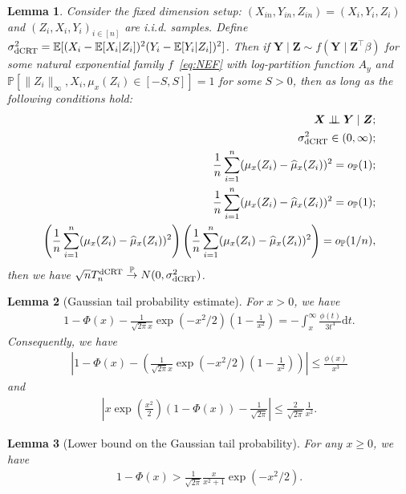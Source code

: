 \documentclass[12pt]{article}
\newtheorem{lemma}{Lemma}
\theoremstyle{definition}
\newcommand{\indep}{\perp \!\!\! \perp}
\def\P{\mathbb{P}}
\def\P{\mathbb{P}}
\newcommand{\E}{\mathbb E}								%
\renewcommand{\P}{\mathbb{P}}							%
\newcommand{\convp}{\overset{\mathbb{P}}{\rightarrow}}             %
\newcommand{\prx}{\bm X}								%
\newcommand{\srx}{X}									%
\newcommand{\prz}{\bm Z}								%
\newcommand{\srz}{Z}									%
\newcommand{\pry}{{\bm Y}}								%
\newcommand{\sry}{Y}									%
\newcommand{\dCRT}{\textnormal{dCRT}} 					%
\begin{document}
\begin{lemma}\label{lem:dCRT_convergence}
  Consider the fixed dimension setup: $(\srx_{in},\sry_{in},\srz_{in})=(\srx_{i},\sry_{i},\srz_{i})$ and $(\srz_{i},\srx_{i},\sry_{i})_{i\in[n]}$ are i.i.d. samples. Define $\sigma_{\dCRT}^2=\E[(\srx_i-\E[\srx_i|\srz_i])^2(\sry_i-\E[\sry_i|\srz_i])^2]$. Then if $\pry \mid \prz \sim f(\pry \mid \prz^\top \beta)$ for some natural exponential family $f$~\eqref{eq:NEF} with log-partition function $A_y$ and $\P[\|\srz_i\|_{\infty},\srx_i,\mu_x(\srz_i)\in [-S,S]]=1$ for some $S>0$, then as long as the following conditions hold:
  \begin{align*}
    \prx\indep\pry\mid \prz;\\
    \sigma_{\dCRT}^2\in (0,\infty);\\
    \frac{1}{n}\sum_{i=1}^n (\mu_{x}(\srz_i)-\widehat\mu_{x}(\srz_i))^2=o_{\P}(1);\\
    \frac{1}{n}\sum_{i=1}^n (\mu_{x}(\srz_i)-\widehat\mu_{x}(\srz_i))^2=o_{\P}(1);\\
    \left(\frac{1}{n}\sum_{i=1}^n (\mu_{x}(\srz_i)-\widehat\mu_{x}(\srz_i))^2\right)\left(
    \frac{1}{n}\sum_{i=1}^n (\mu_{x}(\srz_i)-\widehat\mu_{x}(\srz_i))^2\right)=o_{\P}(1/n),
  \end{align*}
  then we have $\sqrt{n}T_n^{\dCRT}\convp N(0,\sigma_{\dCRT}^2)$.
\end{lemma}

\begin{lemma}[Gaussian tail probability estimate]\label{lem:Gaussian_tail_estimate}
	For $x>0$, we have 
	\begin{align*}
		1-\Phi(x)-\frac{1}{\sqrt{2\pi}x}\exp(-x^2/2)
	  \left(1-\frac{1}{x^2}\right)=-\int_{x}^{\infty}\frac{\phi(t)}{3t^4}\mathrm{d}t.
	\end{align*}
	Consequently, we have 
	\begin{align*}
	  \left|1-\Phi(x)-\left(\frac{1}{\sqrt{2\pi}x}\exp(-x^2/2)
	  \left(1-\frac{1}{x^2}\right)\right)\right|\leq \frac{\phi(x)}{x^3}
	\end{align*}
	and 
	\begin{align*}
		\left|x\exp\left(\frac{x^2}{2}\right)(1-\Phi(x))-\frac{1}{\sqrt{2\pi}}\right|\leq \frac{2}{\sqrt{2\pi}}\frac{1}{x^2}.
	\end{align*}
\end{lemma}

\begin{lemma}[Lower bound on the Gaussian tail probability]\label{lem:lower_bound_Gaussian}
	For any $x\geq 0$, we have 
	\begin{align*}
	  1-\Phi(x)> \frac{1}{\sqrt{2\pi}}\frac{x}{x^2+1}\exp(-x^2/2).
	\end{align*}
\end{lemma}
\end{document}
